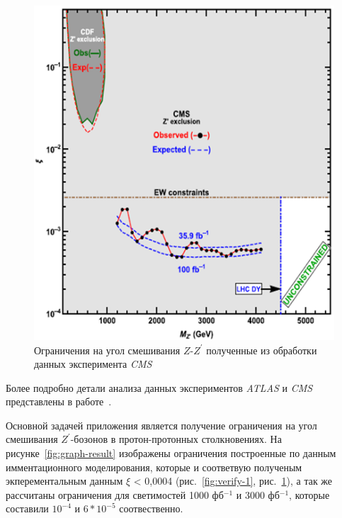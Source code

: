 \begin{figure}[!h]
	\centering
	\includegraphics[width=\textwidth]{figures/verify-2.png}
	\caption{Ограничения на угол смешивания $Z$-${Z}^{\prime}$ полученные из обработки данных эксперимента \textit{CMS}}
	\label{fig:verify-2}
\end{figure}

Более подробно детали анализа данных экспериментов \textit{ATLAS} и \textit{CMS} представлены в работе~\cite{2part-pankov}. 

Основной задачей приложения является получение ограничения на угол смешивания ${Z}^{\prime}$-бозонов в протон-протонных столкновениях. На рисунке~\ref{fig:graph-result} изображены ограничения построенные по данным имментационного моделирования, которые и соответвую полученым экперементальным данным $\xi$ < 0,0004 (рис.~\ref{fig:verify-1}, рис.~\ref{fig:verify-2}), а так же рассчитаны ограничения для светимостей 1000 фб${}^{−1}$ и 3000 фб${}^{−1}$, которые составили ${10}^{-4}$ и $6*{10}^{-5}$ соотвественно.


